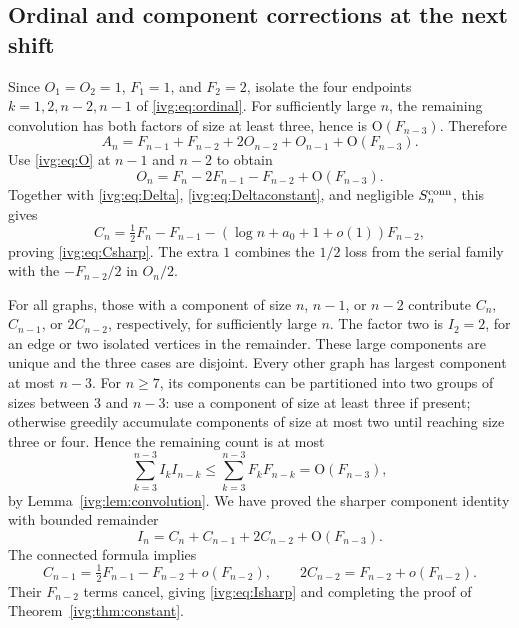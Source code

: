 \documentclass[11pt,letterpaper]{article}
\theoremstyle{definition}\newtheorem{definition}[theorem]{Definition}
\theoremstyle{remark}\newtheorem{remark}[theorem]{Remark}
\newcommand{\OO}{\mathrm O}
\begin{document}
\subsection{Ordinal and component corrections at the next shift}
Since $O_1=O_2=1$, $F_1=1$, and $F_2=2$, isolate the four endpoints $k=1,2,n-2,n-1$ of \eqref{ivg:eq:ordinal}. For sufficiently large $n$, the remaining convolution has both factors of size at least three, hence is $\OO(F_{n-3})$. Therefore
\[
 A_n=F_{n-1}+F_{n-2}+2O_{n-2}+O_{n-1}+\OO(F_{n-3}).
\]
Use \eqref{ivg:eq:O} at $n-1$ and $n-2$ to obtain
\begin{equation}\label{ivg:eq:Osecond}
 O_n=F_n-2F_{n-1}-F_{n-2}+\OO(F_{n-3}).
\end{equation}
Together with \eqref{ivg:eq:Delta}, \eqref{ivg:eq:Deltaconstant}, and negligible $S_n^{\rm conn}$, this gives
\[
 C_n=\tfrac12F_n-F_{n-1}-(\log n+a_0+1+o(1))F_{n-2},
\]
proving \eqref{ivg:eq:Csharp}. The extra $1$ combines the $1/2$ loss from the serial family with the $-F_{n-2}/2$ in $O_n/2$.

For all graphs, those with a component of size $n$, $n-1$, or $n-2$ contribute $C_n$, $C_{n-1}$, or $2C_{n-2}$, respectively, for sufficiently large $n$. The factor two is $I_2=2$, for an edge or two isolated vertices in the remainder. These large components are unique and the three cases are disjoint. Every other graph has largest component at most $n-3$. For $n\ge7$, its components can be partitioned into two groups of sizes between 3 and $n-3$: use a component of size at least three if present; otherwise greedily accumulate components of size at most two until reaching size three or four. Hence the remaining count is at most
\[
 \sum_{k=3}^{n-3}I_kI_{n-k}\le\sum_{k=3}^{n-3}F_kF_{n-k}=\OO(F_{n-3}),
\]
by Lemma~\ref{ivg:lem:convolution}. We have proved the sharper component identity with bounded remainder
\begin{equation}\label{ivg:eq:componentsecond}
 I_n=C_n+C_{n-1}+2C_{n-2}+\OO(F_{n-3}).
\end{equation}
The connected formula implies
\[
 C_{n-1}=\tfrac12F_{n-1}-F_{n-2}+o(F_{n-2}),\qquad
 2C_{n-2}=F_{n-2}+o(F_{n-2}).
\]
Their $F_{n-2}$ terms cancel, giving \eqref{ivg:eq:Isharp} and completing the proof of Theorem~\ref{ivg:thm:constant}.
\end{document}

